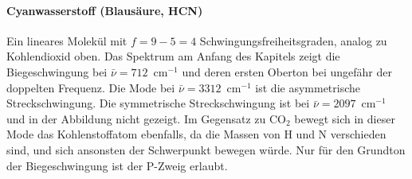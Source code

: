 \paragraph{Cyanwasserstoff (Blausäure, HCN)}  Ein lineares Molekül mit $f=9 - 5 = 4$ Schwingungsfreiheitsgraden, analog zu Kohlendioxid oben. Das Spektrum am Anfang des Kapitels zeigt die Biegeschwingung bei $\bar{\nu} = 712$~cm$^{-1}$ und deren ersten Oberton bei ungefähr der doppelten Frequenz. Die Mode bei  $\bar{\nu} = 3312$~cm$^{-1}$ ist die  asymmetrische Streckschwingung. Die symmetrische Streckschwingung ist bei $\bar{\nu} = 2097$~cm$^{-1}$ und in der Abbildung nicht gezeigt. Im Gegensatz zu CO$_2$ bewegt sich in dieser Mode das Kohlenstoffatom ebenfalls, da die Massen von H und N verschieden sind, und sich ansonsten der  Schwerpunkt bewegen würde. Nur für den Grundton der Biegeschwingung ist der P-Zweig erlaubt.
\begin{marginfigure}
\end{marginfigure}
\begin{marginfigure}
\end{marginfigure}



\printbibliography[segment=\therefsegment,heading=subbibliography]
